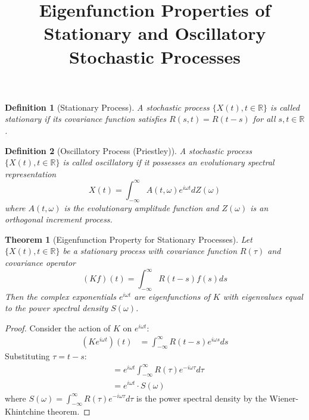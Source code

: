 \documentclass{article}
\newtheorem{theorem}{Theorem}
\newtheorem{definition}{Definition}
\begin{document}
\title{Eigenfunction Properties of Stationary and Oscillatory Stochastic Processes}
\author{}
\date{}
\maketitle

\begin{definition}[Stationary Process]
A stochastic process $\{X(t), t \in \mathbb{R}\}$ is called stationary if its covariance function satisfies $R(s,t) = R(t-s)$ for all $s,t \in \mathbb{R}$.
\end{definition}

\begin{definition}[Oscillatory Process (Priestley)]
A stochastic process $\{X(t), t \in \mathbb{R}\}$ is called oscillatory if it possesses an evolutionary spectral representation
\begin{equation}
X(t) = \int_{-\infty}^{\infty} A(t,\omega)e^{i\omega t} dZ(\omega)
\end{equation}
where $A(t,\omega)$ is the evolutionary amplitude function and $Z(\omega)$ is an orthogonal increment process.
\end{definition}

\begin{theorem}[Eigenfunction Property for Stationary Processes]
Let $\{X(t), t \in \mathbb{R}\}$ be a stationary process with covariance function $R(\tau)$ and covariance operator
\begin{equation}
(Kf)(t) = \int_{-\infty}^{\infty} R(t-s)f(s)ds
\end{equation}
Then the complex exponentials $e^{i\omega t}$ are eigenfunctions of $K$ with eigenvalues equal to the power spectral density $S(\omega)$.
\end{theorem}

\begin{proof}
Consider the action of $K$ on $e^{i\omega t}$:
\begin{align}
(Ke^{i\omega t})(t) &= \int_{-\infty}^{\infty} R(t-s)e^{i\omega s}ds
\end{align}
Substituting $\tau = t-s$:
\begin{align}
&= e^{i\omega t} \int_{-\infty}^{\infty} R(\tau)e^{-i\omega \tau}d\tau \\
&= e^{i\omega t} \cdot S(\omega)
\end{align}
where $S(\omega) = \int_{-\infty}^{\infty} R(\tau)e^{-i\omega \tau}d\tau$ is the power spectral density by the Wiener-Khintchine theorem.
\end{proof}
\end{document}
